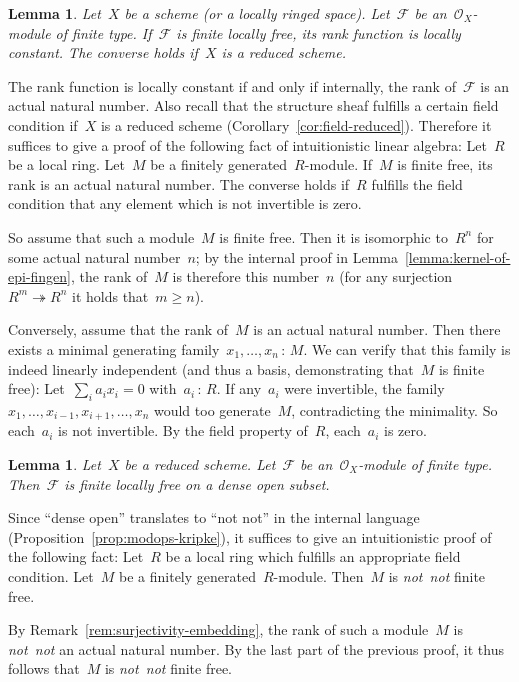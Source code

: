 \documentclass[10pt,reqno,a4paper]{amsbook}
\makeatletter
\theoremstyle{definition}
\theoremstyle{plain}
\newtheorem{lemma}[defn]{Lemma}
\theoremstyle{remark}
\newcommand{\F}{\mathcal{F}}
\renewcommand{\O}{\mathcal{O}}
\newcommand{\?}{\,{:}\,}
\renewcommand{\_}{\mathpunct{.}\,}
\newcommand{\notnot}{\emph{not~not}\xspace}
\renewenvironment{proof}[1][\proofname]{\par
  \pushQED{\qed}%
  \normalfont \topsep6\p@\@plus6\p@\relax
  \trivlist
  \item[\hskip\labelsep
        \itshape
    #1\@addpunct{.}]\ignorespaces
}{%
  \popQED\endtrivlist\@endpefalse
}
\makeatother
\begin{document}
\begin{lemma}\label{lemma:rank-functor-locally-constant}
Let~$X$ be a scheme (or a locally ringed space). Let~$\F$ be an~$\O_X$-module of
finite type. If~$\F$ is finite locally free, its rank function is locally
constant. The converse holds if~$X$ is a reduced scheme.
\end{lemma}
\begin{proof}The rank function is locally constant if and only if internally,
the rank of~$\F$ is an actual natural number. Also recall that the structure
sheaf fulfills a certain field condition if~$X$ is a reduced
scheme (Corollary~\ref{cor:field-reduced}). Therefore it suffices to give a
proof of the following fact of intuitionistic linear algebra: Let~$R$ be a
local ring. Let~$M$ be a finitely generated~$R$-module. If~$M$ is finite
free, its rank is an actual natural number. The converse holds if~$R$ fulfills
the field condition that any element which is not invertible is zero.

So assume that such a module~$M$ is finite free. Then it is isomorphic
to~$R^n$ for some actual natural number~$n$; by the internal proof in
Lemma~\ref{lemma:kernel-of-epi-fingen}, the rank of~$M$ is therefore this
number~$n$ (for any surjection~$R^m \twoheadrightarrow R^n$ it holds that~$m
\geq n$).

Conversely, assume that the rank of~$M$ is an actual natural number. Then
there exists a minimal generating family~$x_1,\ldots,x_n\?M$. We can verify that this family is
indeed linearly independent (and thus a basis, demonstrating that~$M$ is finite
free): Let~$\sum_i a_i x_i = 0$ with~$a_i\?R$. If any~$a_i$ were
invertible, the family~$x_1,\ldots,x_{i-1},x_{i+1},\ldots,x_n$ would too
generate~$M$, contradicting the minimality. So each~$a_i$ is not invertible.
By the field property of~$R$, each~$a_i$ is zero.
\end{proof}

\begin{lemma}\label{lemma:locally-free-dense}
Let~$X$ be a reduced scheme. Let~$\F$ be an~$\O_X$-module of
finite type. Then~$\F$ is finite locally free on a dense open subset.\end{lemma}
\begin{proof}Since ``dense open'' translates to ``not not'' in the internal
language (Proposition~\ref{prop:modops-kripke}), it suffices to give an
intuitionistic proof of the following fact: Let~$R$ be a local ring which fulfills an
appropriate field condition. Let~$M$ be a finitely generated~$R$-module.
Then~$M$ is \notnot finite free.

By Remark~\ref{rem:surjectivity-embedding}, the rank of such a module~$M$ is
\notnot an actual natural number. By the last part of the
previous proof, it thus follows that~$M$ is \notnot finite free.
\end{proof}
\end{document}
